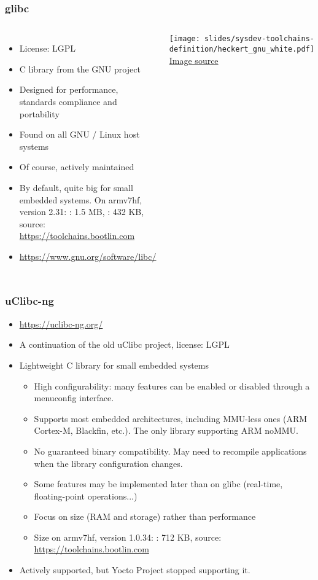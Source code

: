 \begin{frame}
  \frametitle{glibc}
  \begin{columns}[T]
    \begin{itemize}
    \item License: LGPL
    \item C library from the GNU project
    \item Designed for performance, standards compliance and portability
    \item Found on all GNU / Linux host systems
    \item Of course, actively maintained
    \item By default, quite big for small embedded systems.
      On armv7hf, version 2.31: : 1.5 MB, : 432
      KB, source: \url{https://toolchains.bootlin.com}
    \item \url{https://www.gnu.org/software/libc/}
    \end{itemize}
    \vfill
    \minipage[c][0.8\textheight][s]{\columnwidth}
    \texttt{[image: slides/sysdev-toolchains-definition/heckert\_gnu\_white.pdf]}
    \vfill
    \tiny \href{https://en.wikipedia.org/wiki/File:Heckert_GNU_white.svg}{Image source}
    \endminipage
  \end{columns}
\end{frame}

\begin{frame}
  \frametitle{uClibc-ng}
  \begin{itemize}
  \item \url{https://uclibc-ng.org/}
  \item A continuation of the old uClibc project, license: LGPL
  \item Lightweight C library for small embedded systems
    \begin{itemize}
    \item High configurability: many features can be enabled or
      disabled through a menuconfig interface.
    \item Supports most embedded architectures, including MMU-less
          ones (ARM Cortex-M, Blackfin, etc.). The only library
          supporting ARM noMMU.
    \item No guaranteed binary compatibility. May need to
      recompile applications when the library configuration changes.
    \item Some features may be implemented later than on glibc (real-time,
          floating-point operations...)
    \item Focus on size (RAM and storage) rather than performance
    \item Size on armv7hf, version 1.0.34:
      : 712 KB, source: \url{https://toolchains.bootlin.com}
    \end{itemize}
    \item Actively supported, but Yocto Project stopped supporting it.
  \end{itemize}
\end{frame}

